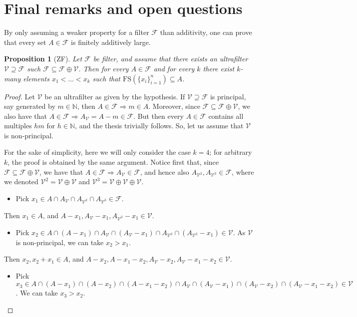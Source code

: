 \documentclass{amsart}
\newtheorem{proposition}[theorem]{Proposition}
\theoremstyle{definition}
\theoremstyle{remark}
\def\F{\mathscr{F}}
\def\V{\mathscr{V}}
\def\N{\mathbb{N}}
\begin{document}
\section{Final remarks and open questions}

By only assuming a weaker property for a filter $\F$
than additivity,  one can prove
that every set $A\in\F$ is finitely additively large.

\begin{proposition}[\textsf{ZF}]\label{weak}
Let $\F$ be filter, and assume that there exists
an ultrafilter $\V\supseteq\F$ such $\F\subseteq\F\oplus\V$.
Then for every $A\in\F$ and for every $k$
there exist $k$-many elements $x_1<\ldots<x_k$ such
that $\mathrm{FS}(\{x_i\}_{i=1}^{n})\subseteq A$.
\end{proposition}

\begin{proof}
Let $\V$ be an ultrafilter as given by the hypothesis.
If $\V\supseteq\F$ is principal, say generated by $m\in\N$, then
$A\in\F\Rightarrow m\in A$.
Moreover, since $\F\subseteq\F\oplus\V$,
we also have that $A\in\F\Rightarrow A_\V=A-m\in\F$.
But then every $A\in\F$ contains all multiples $hm$ for $h\in\N$,
and the thesis trivially follows.
So, let us assume that $\V$ is non-principal.

For the sake of simplicity, here we will only consider the case $k=4$;
for arbitrary $k$, the proof is obtained by the same argument.
Notice first that, since $\F\subseteq\F\oplus\V$,
we have that $A\in\F\Rightarrow A_\V\in\F$, and hence
also $A_{\V^2},A_{\V^3}\in\F$, where we
denoted $\V^2=\V\oplus\V$ and $\V^3=\V\oplus\V\oplus\V$.

\begin{itemize}
\item
Pick $x_1\in A\cap A_\V\cap A_{\V^2}\cap A_{\V^3}\in\F$.
\end{itemize}

Then $x_1\in A$, and $A-x_1,A_\V-x_1,A_{\V^2}-x_1\in\V$.

\begin{itemize}
\item
Pick $x_2\in A\cap(A-x_1)\cap A_\V\cap (A_\V-x_1)
\cap A_{\V^2}\cap(A_{\V^2}-x_1)\in\V$.
As $\V$ is non-principal, we can take $x_2>x_1$.
\end{itemize}

Then $x_2,x_2+x_1\in A$, and
$A-x_2,A-x_1-x_2,A_\V-x_2,A_\V-x_1-x_2\in\V$.

\begin{itemize}
\item
Pick $x_3\in A\cap(A-x_1)\cap(A-x_2)\cap(A-x_1-x_2)\cap 
A_\V\cap (A_\V-x_1)\cap(A_{\V}-x_2)\cap(A_\V-x_1-x_2)\in\V$.
We can take $x_3>x_2$.
\end{itemize}


\end{proof}
\end{document}
